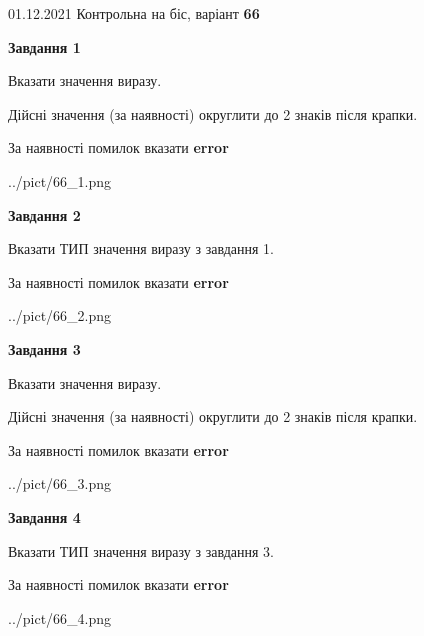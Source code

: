 \documentclass[11pt, ukrainian]{article}
\begin{document}
{01.12.2021 Контрольна на біс, варіант  \No \textbf { 66 }\par}
{
\begin {large}
{\begin {center}\textbf{Завдання 1}\end {center}}\par
Вказати значення виразу. \par
Дійсні значення (за наявності) округлити до 2 знаків після крапки. \par
За наявності помилок вказати \textbf{error}

\begin{center}
	{../pict/66_1.png}
\end{center}
\newpage

{\begin {center}\textbf{Завдання 2}\end {center}}\par
Вказати ТИП значення виразу з завдання 1. \par
За наявності помилок вказати \textbf{error}

\begin{center}
	{../pict/66_2.png}
\end{center}
\newpage

{\begin {center}\textbf{Завдання 3}\end {center}}\par
Вказати значення виразу. \par
Дійсні значення (за наявності) округлити до 2 знаків після крапки. \par
За наявності помилок вказати \textbf{error}

\begin{center}
	{../pict/66_3.png}
\end{center}
\newpage

{\begin {center}\textbf{Завдання 4}\end {center}}\par
Вказати ТИП значення виразу з завдання 3. \par
За наявності помилок вказати \textbf{error}

\begin{center}
	{../pict/66_4.png}
\end{center}
\newpage


\end{large}}
\end{document}
